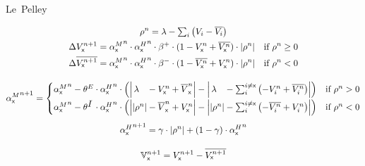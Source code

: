 \documentclass[border=10pt,varwidth=14cm]{standalone}
\begin{document}
\newcommand{\eks}{\textsf{x}}
\newcommand{\longlambda}{\rlap{$\,\lambda$}\phantom{\left| \rho^n \right|}}
\newcommand{\longI}{\rlap{$I$}\phantom{E}}
\newcommand{\VNet}{\mathbb{V}}

\begin{center}
	\huge
	\sffamily
	Le~Pelley
\end{center}
\begin{gather*}
	\begin{gathered}
		\rho^n = \lambda - \textstyle\sum_i \left( V_i - \overline{V_i} \right) \\
		\begin{aligned}
			\Delta V_\eks^{n + 1} &= {\alpha^M_\eks}^n \cdot {\alpha^H_\eks}^n \cdot \beta^+ \cdot (1 - V_\eks^n + \overline{V_\eks^n}) \cdot \left| \rho^n \right| & \text{if } \rho^n \geq 0 \\
			 \Delta \overline{V_\eks^{n + 1}} &= {\alpha^M_\eks}^n \cdot {\alpha^H_\eks}^n \cdot \beta^- \cdot (1 - \overline{V_\eks^n} + V_\eks^n) \cdot \left| \rho^n \right| & \text{if } \rho^n < 0
		\end{aligned}
	\end{gathered} \\[1em]
	\begin{gathered}
		{\alpha^M_\eks}^{n + 1} =
			\begin{cases}
				{\alpha^M_\eks}^n - \theta^E \cdot {\alpha^H_\eks}^n \cdot \left( \left| \longlambda - V_\eks^n + \overline{V}_\eks^n \right| - \left| \longlambda - \textstyle\sum_i^{i \neq \eks} \left( - V_i^n + \overline{V_i^n} \right) \right| \right) & \text{if } \rho^n > 0 \\[1ex]
				 {\alpha^M_\eks}^n -\theta^{\longI} \cdot {\alpha^H_\eks}^n \cdot \left( \left| \left| \rho^n \right| - \overline{V}_\eks^n + V_\eks^n \right| - \left| \left| \rho^n \right| - \textstyle\sum_i^{i \neq \eks} \left( - \overline{V_i^n} + V_i^n \right) \right| \right) & \text{if } \rho^n < 0
			\end{cases} \\[1ex]
				{\alpha^H_\eks}^{n + 1} = \gamma \cdot \left| \rho^n \right| + \left( 1 - \gamma \right) \cdot {\alpha^H_\eks}^{n}
	\end{gathered} \\[1em]
	\VNet{}_\eks^{n + 1} = V_\eks^{n + 1} - \overline{V_\eks^{n + 1}}
\end{gather*}

\nocite{lepelley}

\end{document}
